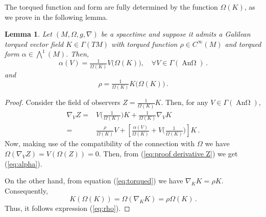 \documentclass[12pt]{article}
\newcommand{\spacetime}{(M,\Omega,g,\nabla)}
\DeclareMathOperator{\An}{\text{An}\Omega}
\newtheorem{lem}[defi]{Lemma}
\begin{document}
The torqued function and form are fully determined by the function $\Omega(K)$, as we prove in the following lemma.
\begin{lem}
    Let $\spacetime$ be a spacetime and suppose it admits a Galilean torqued vector field $K\in \Gamma(TM)$ with torqued function $\rho\in C^\infty(M)$ and torqued form $\alpha \in \bigwedge^1(M)$. Then, 
    \begin{equation}\label{eq:alpha}
        \alpha(V) = \tfrac{1}{\Omega(K)} V\big(\Omega(K)\big), \quad\forall V\in \Gamma(\An)\,.
    \end{equation}
 and
    \begin{equation}\label{eq:rho}
        \rho = \tfrac{1}{\Omega(K)} K\big( \Omega(K)\big)\,.
    \end{equation}
\end{lem}
\begin{proof}
    Consider the field of observers $Z=\frac{1}{\Omega(K)} K$. Then, for any $V\in \Gamma(\An)$,
    \begin{equation}\label{eq:proof derivative Z}
    \begin{split}
        \nabla_V Z ={}& V\big(\tfrac{1}{\Omega(K)}\big) K + \tfrac{1}{\Omega(K)} \nabla_V K \\
        ={}& \tfrac{\rho}{\Omega(K)} V + \left[ \tfrac{\alpha(V)}{\Omega(K)} + V\big(\tfrac{1}{\Omega(K)}\big) \right] K\,.
    \end{split}
    \end{equation}
    Now, making use of the compatibility of the connection with $\Omega$ we have $\Omega(\nabla_V Z) = V(\Omega(Z)) = 0$. Then, from (\ref{eq:proof derivative Z}) we get (\ref{eq:alpha}).

    On the other hand, from equation (\ref{eq:torqued}) we have $\nabla_K K = \rho K$. Consequently,
    \[
        K(\Omega(K)) = \Omega(\nabla_K K) = \rho \Omega(K)\,.
    \]
    Thus, it follows expression (\ref{eq:rho}).
\end{proof}
\end{document}
